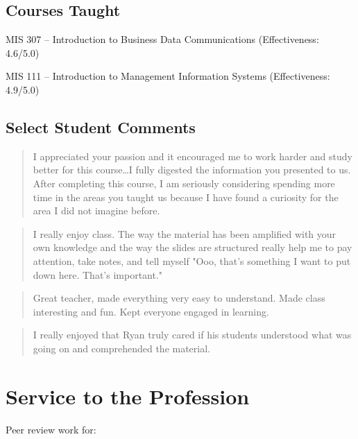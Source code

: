 \documentclass[10pt, a4paper]{article}
\newcommand{\years}[1]{\marginnote{\scriptsize #1}}
\begin{document}

\subsection*{Courses Taught}

\years{2013-2015}MIS 307 -- Introduction to Business Data Communications
(Effectiveness: 4.6/5.0)

\years{2012}MIS 111 -- Introduction to Management Information Systems
(Effectiveness: 4.9/5.0)

\subsection*{Select Student Comments}

\begin{quote}
  I appreciated your passion and it encouraged me to work harder and study better for this
  course\ldots I fully digested the information you presented to us. After completing this
  course, I am seriously considering spending more time in the areas you taught us because
  I have found a curiosity for the area I did not imagine before.
\end{quote}

\begin{quote}
  I really enjoy class. The way the material has been amplified with your own knowledge
  and the way the slides are structured really help me to pay attention, take notes, and
  tell myself "Ooo, that's something I want to put down here. That's important."
\end{quote}

\begin{quote}
  Great teacher, made everything very easy to understand. Made class interesting and
  fun. Kept everyone engaged in learning.
\end{quote}

\begin{quote}
  I really enjoyed that Ryan truly cared if his students understood what was going on and
  comprehended the material.
\end{quote}

\section*{Service to the Profession}
Peer review work for:
\end{document}
